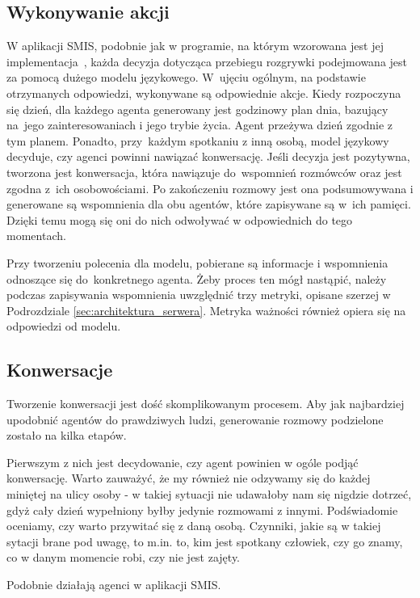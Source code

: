 \subsection{Wykonywanie akcji}

W aplikacji SMIS, podobnie jak w programie, na którym wzorowana jest jej implementacja~\cite{park2023generativeagentsinteractivesimulacra}, każda decyzja dotycząca przebiegu rozgrywki podejmowana jest za pomocą dużego modelu językowego. W~ujęciu ogólnym, na podstawie otrzymanych odpowiedzi, wykonywane są odpowiednie akcje. Kiedy rozpoczyna się dzień, dla każdego agenta generowany jest godzinowy plan dnia, bazujący na~jego zainteresowaniach i jego trybie życia. Agent przeżywa dzień zgodnie z tym planem. Ponadto, przy~każdym spotkaniu z inną osobą, model językowy decyduje, czy agenci powinni nawiązać konwersację. Jeśli decyzja jest pozytywna, tworzona jest konwersacja, która nawiązuje do~wspomnień rozmówców oraz jest zgodna z~ich osobowościami. Po zakończeniu rozmowy jest ona podsumowywana i generowane są wspomnienia dla obu agentów, które zapisywane są w~ich pamięci. Dzięki temu mogą się oni do nich odwoływać w odpowiednich do tego momentach.

Przy tworzeniu polecenia dla modelu, pobierane są informacje i wspomnienia odnoszące się do~konkretnego agenta. Żeby proces ten mógł nastąpić, należy podczas zapisywania wspomnienia uwzględnić trzy metryki, opisane szerzej w Podrozdziale \ref{sec:architektura_serwera}. Metryka ważności również opiera się na odpowiedzi od modelu.

\subsection{Konwersacje}

Tworzenie konwersacji jest dość skomplikowanym procesem. Aby jak najbardziej upodobnić agentów do prawdziwych ludzi, generowanie rozmowy podzielone zostało na kilka etapów.

Pierwszym z nich jest decydowanie, czy agent powinien w ogóle podjąć konwersację. Warto zauważyć, że my również nie odzywamy się do każdej miniętej na ulicy osoby - w takiej sytuacji nie udawałoby nam się nigdzie dotrzeć, gdyż cały dzień wypełniony byłby jedynie rozmowami z innymi. Podświadomie oceniamy, czy warto przywitać się z daną osobą. Czynniki, jakie są w takiej sytacji brane pod uwagę, to m.in. to, kim jest spotkany człowiek, czy go znamy, co w danym momencie robi, czy nie jest zajęty.

Podobnie działają agenci w aplikacji SMIS.




